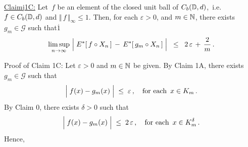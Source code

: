 \vskip 0.8cm
\begin{center}\begin{minipage}{6.5in}
\underline{Claim{{\color{white}j}}1C:}\;\;
Let \,$f$ be an element of the closed unit ball of $C_{b}(\mathbb{D},d)$,\,
i.e. $f \in C_{b}(\mathbb{D},d)$ and $\Vert\,f\,\Vert_{\infty} \leq 1$.
Then, for each $\varepsilon > 0$, and $m \in \mathbb{N}$,
there exists $g_{m} \in \mathcal{G}$
such that{\color{white}$\overset{.}{1}$}
\begin{equation*}
\underset{n\rightarrow\infty}{\limsup}\,
\left\vert\; \overset{{\color{white}.}}{E^{*}}[\,f \circ X_{n}\,] \,-\, E^{*}[\,g_{m} \circ X_{n}\,] \;\right\vert
\;\; \leq \;\;
	2\,\varepsilon \,+\, \dfrac{2}{m}\,.
\end{equation*}
\end{minipage}\end{center}
Proof of Claim 1C:\;\;
Let $\varepsilon > 0$ and $m \in \mathbb{N}$ be given. By Claim 1A,
there exists $g_{m} \in \mathcal{G}$ such that
\begin{equation*}
\left\vert\;f(x) \overset{{\color{white}.}}{-} g_{m}(x)\;\right\vert \;\leq\; \varepsilon\,,
\quad
\textnormal{for each \,$x \in K_{m}$}\,.
\end{equation*}
By Claim 0, there exists $\delta > 0$ such that
\begin{equation*}
\left\vert\;f(x) \overset{{\color{white}.}}{-} g_{m}(x)\;\right\vert \;\leq\; 2\,\varepsilon\,,
\quad
\textnormal{for each \,$x \in K_{m}^{\delta}$}\,.
\end{equation*}
Hence,
